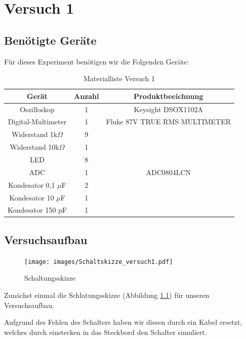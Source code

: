 \chapter{Versuch 1}

\section{Benötigte Geräte}

Für dieses Experiment benötigen wir die Folgenden Geräte:


\begin{table}[h]	
	\centering
	\begin{tabular}[h]{c|c|c}
		\centering
		Gerät & Anzahl & Produktbeeichnung\\
		\hline
		Oszilloskop & 1  & Keysight DSOX1102A\\
		\hline
		Digital-Multimeter & 1 & Fluke 87V TRUE RMS MULTIMETER\\
		\hline 
		Widerstand 1k$\Omega$ & 9 &  \\
		\hline 
		Widerstand 10k$\Omega$ & 1 &  \\
		\hline
		LED & 8 & \\
		\hline
		ADC & 1 & ADC0804LCN \\
		\hline
		Kondesator 0,1 $\mu$F & 2 & \\
		\hline
		Kondesator 10 $\mu$F & 1 & \\
		\hline
		Kondesator 150 pF & 1 & 
			\label{tab:Materialliste Versuch 1}
	\end{tabular}
	\caption{Materialliste Versuch 1}
	\label{tab:Materialliste Versuch 1}
\end{table}

\section{Versuchsaufbau}


\begin{figure}[H]
	\centering
	\texttt{[image: images/Schaltskizze\_versuch1.pdf]} 
	\caption{Schaltungsskizze}
	\label{fig: Schaltungsskizze}
\end{figure}

Zunächst einmal die Schlatungsskizze (Abbildung \ref{fig: Schaltungsskizze}) für unseren Versuchsaufbau.

Aufgrund des Fehlen des Schalters haben wir diesen durch ein Kabel ersetzt, welches 
durch einstecken in das Steckbord den Schalter simuliert. \par

